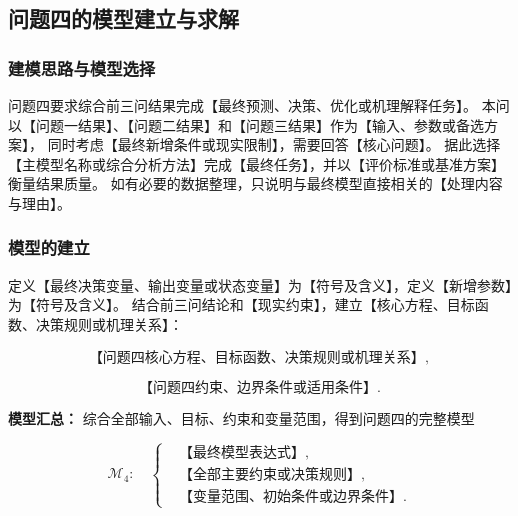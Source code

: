 
\subsection{问题四的模型建立与求解}

\subsubsection{建模思路与模型选择}

问题四要求综合前三问结果完成【最终预测、决策、优化或机理解释任务】。
本问以【问题一结果】、【问题二结果】和【问题三结果】作为【输入、参数或备选方案】，
同时考虑【最终新增条件或现实限制】，需要回答【核心问题】。
据此选择【主模型名称或综合分析方法】完成【最终任务】，并以【评价标准或基准方案】衡量结果质量。
如有必要的数据整理，只说明与最终模型直接相关的【处理内容与理由】。

\subsubsection{模型的建立}

定义【最终决策变量、输出变量或状态变量】为【符号及含义】，定义【新增参数】为【符号及含义】。
结合前三问结论和【现实约束】，建立【核心方程、目标函数、决策规则或机理关系】：

\begin{equation}
  \text{【问题四核心方程、目标函数、决策规则或机理关系】},
  \label{eq:q4_core}
\end{equation}

\begin{equation}
  \text{【问题四约束、边界条件或适用条件】}.
  \label{eq:q4_constraint}
\end{equation}

\noindent\textbf{模型汇总：}
综合全部输入、目标、约束和变量范围，得到问题四的完整模型

\begin{equation}
  \mathcal{M}_4:\quad
  \left\{
  \begin{aligned}
    &\text{【最终模型表达式】},\\
    &\text{【全部主要约束或决策规则】},\\
    &\text{【变量范围、初始条件或边界条件】}.
  \end{aligned}
  \right.
  \label{eq:q4_summary}
\end{equation}

